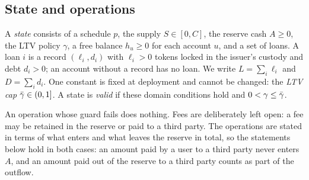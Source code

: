 \subsection{State and operations}

A \emph{state} consists of a schedule $p$, the supply $S\in[0,C]$, the reserve cash $A\ge 0$, the LTV policy $\gamma$, a free balance $h_u\ge0$ for each account $u$, and a set of loans. A loan $i$ is a record $(\ell_i,d_i)$ with $\ell_i>0$ tokens locked in the issuer's custody and debt $d_i>0$; an account without a record has no loan. We write $L=\sum_i\ell_i$ and $D=\sum_i d_i$. One constant is fixed at deployment and cannot be changed: the \emph{LTV cap} $\bar\gamma\in(0,1]$. A state is \emph{valid} if these domain conditions hold and $0<\gamma\le\bar\gamma$.

An operation whose guard fails does nothing. Fees are deliberately left open: a fee may be retained in the reserve or paid to a third party. The operations are stated in terms of what enters and what leaves the reserve in total, so the statements below hold in both cases: an amount paid by a user to a third party never enters $A$, and an amount paid out of the reserve to a third party counts as part of the outflow.

